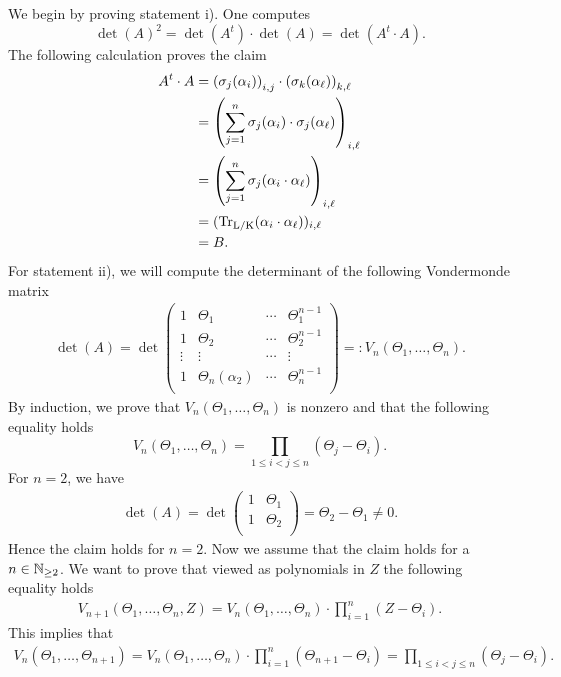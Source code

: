 \begin{Bew}
	We begin by proving statement i). One computes
	$$\det(A)^2=\det(A^t)\cdot\det(A)=\det(A^t\cdot A).$$
	The following calculation proves the claim
	\begin{align*}
		A^t\cdot A&=\left( \sigma_j(\alpha_i)\right) _{i,j}\cdot\left( \sigma_k(\alpha_\ell)\right) _{k,\ell}\\
		&=\left( \sum_{j=1}^{n} \sigma_j(\alpha_i)\cdot \sigma_j(\alpha_\ell)\right) _{i,\ell}\\
		&=\left( \sum_{j=1}^{n} \sigma_j(\alpha_i\cdot\alpha_\ell)\right) _{i,\ell}\\
		&=(\operatorname{Tr_{L/K}}(\alpha_i\cdot\alpha_\ell))_{i,\ell}\\
		&=B.
	\end{align*}
	For statement ii), we will compute the determinant of the following Vondermonde matrix
	\begin{align*}
	\det(A)=\det\begin{pmatrix}
	1 & \Theta_1 &\cdots& \Theta_1^{n-1} \\
	1 & \Theta_2 & \cdots& \Theta_2^{n-1} \\
	\vdots &\vdots &\cdots&\vdots\\
	1 & \Theta_n(\alpha_2) &\cdots& \Theta_n^{n-1} \\
	\end{pmatrix}
	=:V_n(\Theta_1,\dots,\Theta_n).
	\end{align*}
	By induction, we prove that $V_n(\Theta_1,\dots,\Theta_n)$ is nonzero and that the following equality holds
	$$V_n(\Theta_1,\dots,\Theta_n)=\prod_{1\le i<j\le n} (\Theta_j-\Theta_i).$$ 
	For $n=2$, we have
		\begin{align*}
		\det(A)=\det\begin{pmatrix}
		1 & \Theta_1 \\
		1 & \Theta_2 \\
		\end{pmatrix}
		=\Theta_2-\Theta_1\neq 0.
		\end{align*}
	Hence the claim holds for $n=2$. Now we assume that the claim holds for a $n\in\mathbb{N}_{\ge 2}$. We want to prove that viewed as polynomials in $Z$ the following equality holds \begin{align}\label{eq vandermonde}
		V_{n+1}(\Theta_1,\dots,\Theta_{n},Z)=V_n(\Theta_1,\dots,\Theta_n)\cdot\prod_{i=1}^{n}(Z-\Theta_i).
	\end{align}
	This implies that 
	\begin{align*}
		V_n(\Theta_1,\dots,\Theta_{n+1})=V_n(\Theta_1,\dots,\Theta_n)\cdot\prod_{i=1}^{n}(\Theta_{n+1}-\Theta_i)=\prod_{1\le i<j\le n} (\Theta_j-\Theta_i).

\end{align*}
\end{Bew}
